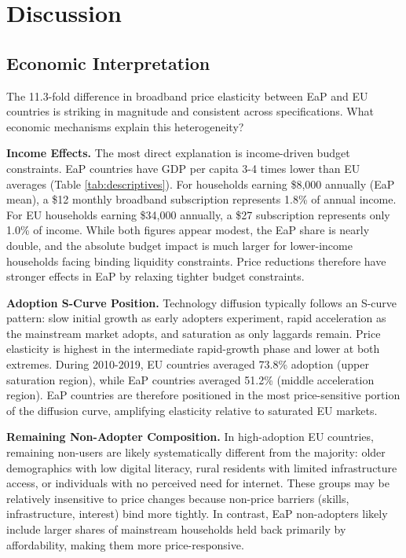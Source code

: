 \documentclass[12pt,review]{elsarticle}
\begin{document}


\section{Discussion}
\label{sec:discussion}

\subsection{Economic Interpretation}

The 11.3-fold difference in broadband price elasticity between EaP and EU countries is striking in magnitude and consistent across specifications. What economic mechanisms explain this heterogeneity?

\textbf{Income Effects.} The most direct explanation is income-driven budget constraints. EaP countries have GDP per capita 3-4 times lower than EU averages (Table \ref{tab:descriptives}). For households earning \$8,000 annually (EaP mean), a \$12 monthly broadband subscription represents 1.8\% of annual income. For EU households earning \$34,000 annually, a \$27 subscription represents only 1.0\% of income. While both figures appear modest, the EaP share is nearly double, and the absolute budget impact is much larger for lower-income households facing binding liquidity constraints. Price reductions therefore have stronger effects in EaP by relaxing tighter budget constraints.

\textbf{Adoption S-Curve Position.} Technology diffusion typically follows an S-curve pattern: slow initial growth as early adopters experiment, rapid acceleration as the mainstream market adopts, and saturation as only laggards remain. Price elasticity is highest in the intermediate rapid-growth phase and lower at both extremes. During 2010-2019, EU countries averaged 73.8\% adoption (upper saturation region), while EaP countries averaged 51.2\% (middle acceleration region). EaP countries are therefore positioned in the most price-sensitive portion of the diffusion curve, amplifying elasticity relative to saturated EU markets.

\textbf{Remaining Non-Adopter Composition.} In high-adoption EU countries, remaining non-users are likely systematically different from the majority: older demographics with low digital literacy, rural residents with limited infrastructure access, or individuals with no perceived need for internet. These groups may be relatively insensitive to price changes because non-price barriers (skills, infrastructure, interest) bind more tightly. In contrast, EaP non-adopters likely include larger shares of mainstream households held back primarily by affordability, making them more price-responsive.
\end{document}
